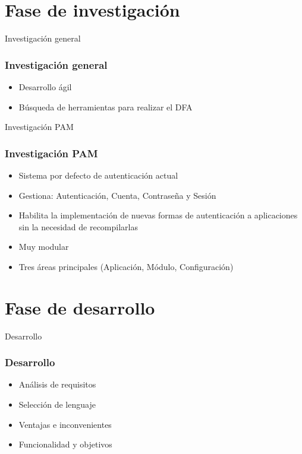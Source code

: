 \documentclass{beamer}
\begin{document}
\section{Fase de investigación}
\begin{frame}{Investigación general}
	\frametitle{Investigación general}
	\begin{itemize}
		\item Desarrollo ágil
		\vspace{0.7cm}
		\item Búsqueda de herramientas para realizar el DFA
	\end{itemize}
\end{frame}
\begin{frame}{Investigación PAM}
	\frametitle{Investigación PAM}
	\begin{itemize}
		\item Sistema por defecto de autenticación actual
		\vspace{0.7cm}
		\item Gestiona: Autenticación, Cuenta, Contraseña y Sesión
		\vspace{0.7cm}
		\item Habilita la implementación de nuevas formas de autenticación a aplicaciones sin la necesidad de recompilarlas
		\vspace{0.7cm}
		\item Muy modular
		\vspace{0.7cm}
		\item Tres áreas principales (Aplicación, Módulo, Configuración)
	\end{itemize}
\end{frame}
\section{Fase de desarrollo}
\begin{frame}{Desarrollo}
	\frametitle{Desarrollo}
	\begin{itemize}
		\item Análisis de requisitos
		\vspace{0.7cm}
		\item Selección de lenguaje
		\vspace{0.7cm}
		\item Ventajas e inconvenientes
		\vspace{0.7cm}
		\item Funcionalidad y objetivos
	\end{itemize}
\end{frame}
\end{document}

